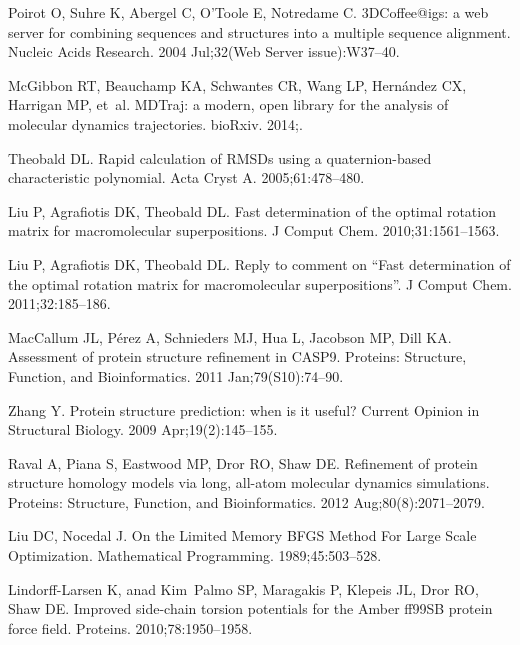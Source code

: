 \documentclass[10pt,letterpaper]{article}
\begin{document}
\begin{thebibliography}{100}
Poirot O, Suhre K, Abergel C, O'Toole E, Notredame C.
\newblock 3DCoffee@igs: a web server for combining sequences and structures
  into a multiple sequence alignment.
\newblock Nucleic Acids Research. 2004 Jul;32(Web Server issue):W37--40.

McGibbon RT, Beauchamp KA, Schwantes CR, Wang LP, Hern{\'a}ndez CX, Harrigan
  MP, et~al.
\newblock MDTraj: a modern, open library for the analysis of molecular dynamics
  trajectories.
\newblock bioRxiv. 2014;.

Theobald DL.
\newblock Rapid calculation of {RMSDs} using a quaternion-based characteristic
  polynomial.
\newblock Acta Cryst A. 2005;61:478--480.

Liu P, Agrafiotis DK, Theobald DL.
\newblock Fast determination of the optimal rotation matrix for macromolecular
  superpositions.
\newblock J Comput Chem. 2010;31:1561--1563.

Liu P, Agrafiotis DK, Theobald DL.
\newblock Reply to comment on ``Fast determination of the optimal rotation
  matrix for macromolecular superpositions''.
\newblock J Comput Chem. 2011;32:185--186.

MacCallum JL, P{\'e}rez A, Schnieders MJ, Hua L, Jacobson MP, Dill KA.
\newblock Assessment of protein structure refinement in {CASP}9.
\newblock Proteins: Structure, Function, and Bioinformatics. 2011
  Jan;79(S10):74--90.

Zhang Y.
\newblock Protein structure prediction: when is it useful?
\newblock Current Opinion in Structural Biology. 2009 Apr;19(2):145--155.

Raval A, Piana S, Eastwood MP, Dror RO, Shaw DE.
\newblock Refinement of protein structure homology models via long, all-atom
  molecular dynamics simulations.
\newblock Proteins: Structure, Function, and Bioinformatics. 2012
  Aug;80(8):2071--2079.

Liu DC, Nocedal J.
\newblock On the Limited Memory {BFGS} Method For Large Scale Optimization.
\newblock Mathematical Programming. 1989;45:503--528.

Lindorff-Larsen K, anad Kim~Palmo SP, Maragakis P, Klepeis JL, Dror RO, Shaw
  DE.
\newblock Improved side-chain torsion potentials for the {Amber} {ff99SB}
  protein force field.
\newblock Proteins. 2010;78:1950--1958.


\end{thebibliography}
\end{document}
